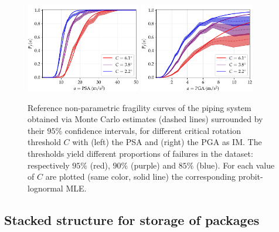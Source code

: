     
    
    \begin{figure}[h]
        \centering
        \includegraphics[width=5cm]{figures/intro-frags/asg/refs_PSA.pdf}
        \includegraphics[width=5cm]{figures/intro-frags/asg/refs_PGA.pdf}
        \caption{{Reference non-parametric fragility curves of the piping system obtained via Monte Carlo estimates (dashed lines) surrounded by their $95\%$ confidence intervals, for different critical rotation threshold $C$ with (left) the PSA and (right) the PGA as IM.} The thresholds yield different proportions of failures in the dataset: respectively $95\%$ (red), $90\%$ (purple) and $85\%$ (blue).
        For each value of $C$ are plotted (same color, solid line) the corresponding probit-lognormal MLE.}
        \label{fig:asg:reference-frags}
        \end{figure}

    

  
   
    


    \subsection{Stacked structure for storage of packages}\label{sec:intro-frags:stacked}



